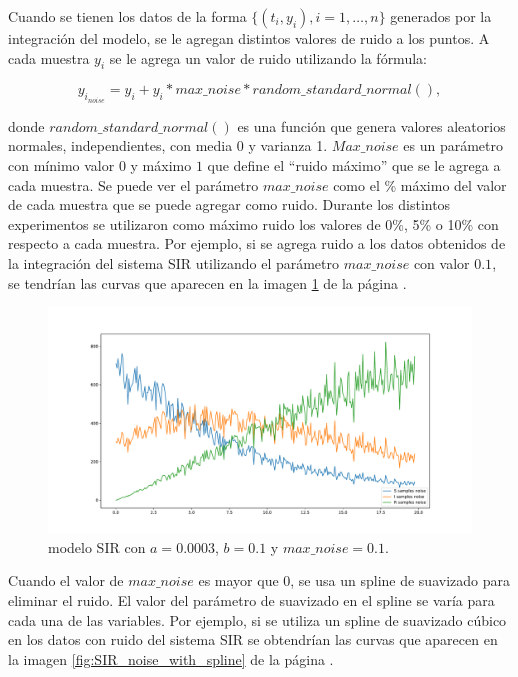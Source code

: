 Cuando se tienen los datos de la forma $\{(t_i, y_i), i=1, \dots, n\}$ generados por la integración del modelo, se le agregan distintos valores de ruido a los puntos. A cada muestra $y_i$ se le agrega un valor de ruido utilizando la fórmula:

$$y_{i_{noise}} = y_i + y_i * max\_noise * random\_standard\_normal(),$$

donde $random\_standard\_normal()$ es una función que genera valores aleatorios normales, independientes, con media 0 y varianza 1. $Max\_noise$ es un parámetro con mínimo valor $0$ y máximo $1$ que define el ``ruido  máximo'' que se le agrega a cada muestra. Se puede ver el parámetro $max\_noise$ como el \% máximo del valor de cada muestra que se puede agregar como ruido. Durante los distintos experimentos se utilizaron como máximo ruido los valores de 0\%, 5\% o 10\% con respecto a cada muestra. Por ejemplo, si se agrega ruido a los datos obtenidos de la integración del sistema SIR utilizando el parámetro $max\_noise$ con valor $0.1$, se tendrían las curvas que aparecen en la imagen \ref{fig:SIR_with_noise} de la página \pageref{fig:SIR_with_noise}.

\begin{figure}[h]
    \centering
    \includegraphics[width=\textwidth]{"figures/SIR_with_noise.pdf"}
    \caption{modelo SIR con $a = 0.0003$, $b = 0.1$ y $max\_noise = 0.1$.}
    \label{fig:SIR_with_noise}
\end{figure}

Cuando el valor de $max\_noise$ es mayor que 0, se usa un spline de suavizado para eliminar el ruido. El valor del parámetro de suavizado en el spline se varía para cada una de las variables. Por ejemplo, si se utiliza un spline de suavizado cúbico en los datos con ruido del sistema SIR se obtendrían las curvas que aparecen en la imagen \ref{fig:SIR_noise_with_spline} de la página \pageref{fig:SIR_noise_with_spline}.

